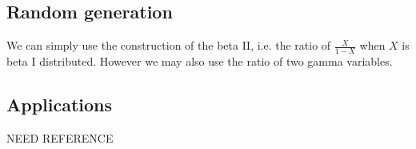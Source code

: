 \subsection{Random generation}
We can simply use the construction of the beta II, i.e. the ratio of $\frac{X}{1-X}$ when $X$ is beta I distributed. However we may also use the ratio of two gamma variables.

\subsection{Applications}
NEED REFERENCE

